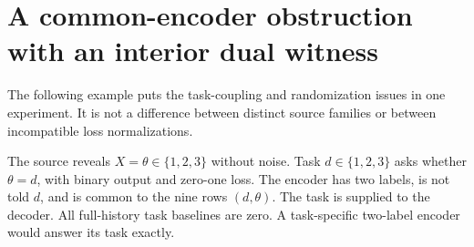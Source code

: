 \section{A common-encoder obstruction with an interior dual witness}
\label{sec:v10-membership}

The following example puts the task-coupling and randomization issues
in one experiment. It is not a difference between distinct source
families or between incompatible loss normalizations.

The source reveals $X=\theta\in\{1,2,3\}$ without noise. Task
$d\in\{1,2,3\}$ asks whether $\theta=d$, with binary output and
zero-one loss. The encoder has two labels, is not told $d$, and is
common to the nine rows $(d,\theta)$. The task is supplied to the
decoder. All full-history task baselines are zero. A task-specific
two-label encoder would answer its task exactly.

